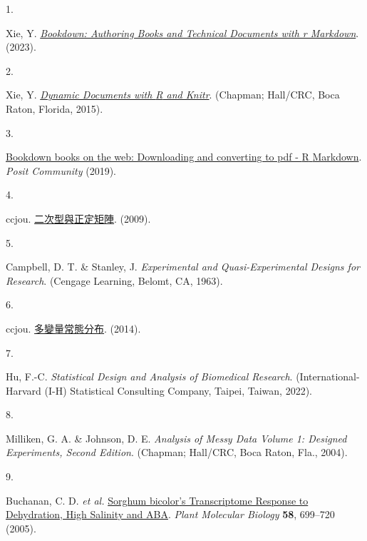\documentclass[
]{book}
\newlength{\cslhangindent}
\newlength{\csllabelwidth}
\newlength{\cslentryspacingunit} %
\newenvironment{CSLReferences}[2] %
 {%
  \setlength{\parindent}{0pt}
  \ifodd #1
  \let\oldpar\par
  \def\par{\hangindent=\cslhangindent\oldpar}
  \fi
  \setlength{\parskip}{#2\cslentryspacingunit}
 }%
 {}
\newcommand{\CSLLeftMargin}[1]{\parbox[t]{\csllabelwidth}{#1}}
\newcommand{\CSLRightInline}[1]{\parbox[t]{\linewidth - \csllabelwidth}{#1}\break}
\theoremstyle{definition}
\theoremstyle{definition}
\theoremstyle{definition}
\theoremstyle{definition}
\theoremstyle{remark}
\begin{document}
\hypertarget{refs}{}
\begin{CSLReferences}{0}{0}
\leavevmode{}%
\CSLLeftMargin{1. }%
\CSLRightInline{Xie, Y. \emph{\href{https://github.com/rstudio/bookdown}{Bookdown: Authoring Books and Technical Documents with r Markdown}}. (2023).}

\leavevmode{}%
\CSLLeftMargin{2. }%
\CSLRightInline{Xie, Y. \emph{\href{http://yihui.org/knitr/}{Dynamic Documents with {R} and Knitr}}. (Chapman; Hall/CRC, Boca Raton, Florida, 2015).}

\leavevmode{}%
\CSLLeftMargin{3. }%
\CSLRightInline{\href{https://community.rstudio.com/t/bookdown-books-on-the-web-downloading-and-converting-to-pdf/30268}{Bookdown books on the web: Downloading and converting to pdf - {R} {Markdown}}. \emph{Posit Community} (2019).}

\leavevmode{}%
\CSLLeftMargin{4. }%
\CSLRightInline{ccjou. \href{https://ccjou.wordpress.com/2009/10/21/\%e4\%ba\%8c\%e6\%ac\%a1\%e5\%9e\%8b\%e8\%88\%87\%e6\%ad\%a3\%e5\%ae\%9a\%e7\%9f\%a9\%e9\%99\%a3/}{二次型與正定矩陣}. (2009).}

\leavevmode{}%
\CSLLeftMargin{5. }%
\CSLRightInline{Campbell, D. T. \& Stanley, J. \emph{Experimental and Quasi-Experimental Designs for Research}. (Cengage Learning, Belomt, CA, 1963).}

\leavevmode{}%
\CSLLeftMargin{6. }%
\CSLRightInline{ccjou. \href{https://ccjou.wordpress.com/2014/06/05/\%e5\%a4\%9a\%e8\%ae\%8a\%e9\%87\%8f\%e5\%b8\%b8\%e6\%85\%8b\%e5\%88\%86\%e5\%b8\%83/}{多變量常態分布}. (2014).}

\leavevmode{}%
\CSLLeftMargin{7. }%
\CSLRightInline{Hu, F.-C. \emph{Statistical Design and Analysis of Biomedical Research}. (International-Harvard (I-H) Statistical Consulting Company, Taipei, Taiwan, 2022).}

\leavevmode{}%
\CSLLeftMargin{8. }%
\CSLRightInline{Milliken, G. A. \& Johnson, D. E. \emph{Analysis of Messy Data Volume 1: Designed Experiments, Second Edition}. (Chapman; Hall/CRC, Boca Raton, Fla., 2004).}

\leavevmode{}%
\CSLLeftMargin{9. }%
\CSLRightInline{Buchanan, C. D. \emph{et al.} \href{https://doi.org/10.1007/s11103-005-7876-2}{Sorghum bicolor{'}s Transcriptome Response to Dehydration, High Salinity and ABA}. \emph{Plant Molecular Biology} \textbf{58}, 699--720 (2005).}


\end{CSLReferences}
\end{document}
